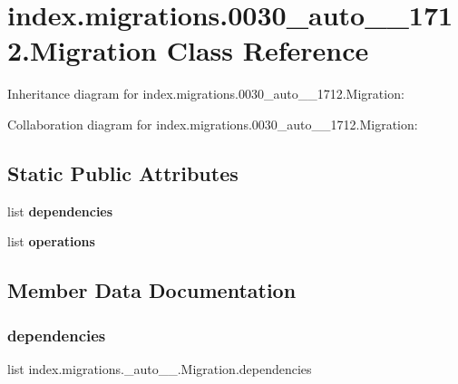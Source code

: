\hypertarget{classindex_1_1migrations_1_10030__auto__20171028__1712_1_1Migration}{}\section{index.\+migrations.0030\+\_\+auto\+\_\+\_\+1712.Migration Class Reference}
\label{classindex_1_1migrations_1_10030__auto__20171028__1712_1_1Migration}


Inheritance diagram for index.\+migrations.0030\+\_\+auto\+\_\+\_\+1712.Migration\+:


Collaboration diagram for index.\+migrations.0030\+\_\+auto\+\_\+\_\+1712.Migration\+:
\subsection*{Static Public Attributes}
\begin{DoxyCompactItemize}
\item 
list {\bfseries dependencies}
\item 
list {\bfseries operations}
\end{DoxyCompactItemize}


\subsection{Member Data Documentation}
\mbox{\label{classindex_1_1migrations_1_10030__auto__20171028__1712_1_1Migration_af5324fa6025037427cdb7f6c08796cb1}} 
\subsubsection{\texorpdfstring{dependencies}{dependencies}}
{\footnotesize\ttfamily list index.\+migrations.\+\_\+auto\+\_\+\_.\+Migration.\+dependencies\hspace{0.3cm}{\ttfamily [static]}}

